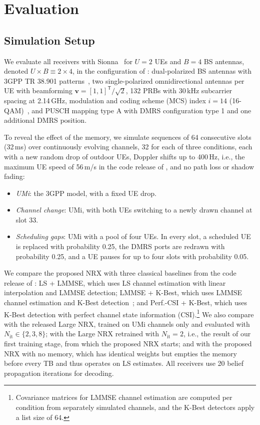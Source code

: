 \section{Evaluation}

\subsection{Simulation Setup}
We evaluate all receivers with Sionna~\cite{hoydis2022} for $U=2$ UEs and $B=4$ BS antennas, denoted $U\times B\equiv 2\times 4$, in the configuration of \citet{wiesmayr2025realtime}: dual-polarized BS antennas with 3GPP TR 38.901 patterns~\cite{tr38901}, two single-polarized omnidirectional antennas per UE with beamforming $\mathbf{v}=[1,1]^{\mathsf{T}}/\sqrt{2}$, 132 PRBs with 30\,kHz subcarrier spacing at 2.14\,GHz, modulation and coding scheme (MCS) index $i=14$ (16-QAM)~\cite[Table~5.1.3.1-1]{3gpp38214}, and PUSCH mapping type A with DMRS configuration type 1 and one additional DMRS position.

To reveal the effect of the memory, we simulate sequences of 64 consecutive slots (32\,ms) over continuously evolving channels, 32 for each of three conditions, each with a new random drop of outdoor UEs, Doppler shifts up to 400\,Hz, i.e., the maximum UE speed of 56\,m/s in the code release of \citet{wiesmayr2025realtime}, and no path loss or shadow fading:
\begin{itemize}
\item \emph{UMi}: the 3GPP model, with a fixed UE drop.
\item \emph{Channel change}: UMi, with both UEs switching to a newly drawn channel at slot 33.
\item \emph{Scheduling gaps}: UMi with a pool of four UEs. In every slot, a scheduled UE is replaced with probability 0.25, the DMRS ports are redrawn with probability 0.25, and a UE pauses for up to four slots with probability 0.05.
\end{itemize}

We compare the proposed NRX with three classical baselines from the code release of \citet{wiesmayr2025realtime}: LS + LMMSE, which uses LS channel estimation with linear interpolation and LMMSE detection; LMMSE + K-Best, which uses LMMSE channel estimation and K-Best detection~\cite{guo2006}; and Perf.-CSI + K-Best, which uses K-Best detection with perfect channel state information (CSI).\footnote{Covariance matrices for LMMSE channel estimation are computed per condition from separately simulated channels, and the K-Best detectors apply a list size of 64.} We also compare with the released Large NRX, trained on UMi channels only and evaluated with $N_{\mathrm{it}}\in\{2,3,8\}$; with the Large NRX retrained with $N_{\mathrm{it}}=2$, i.e., the result of our first training stage, from which the proposed NRX starts; and with the proposed NRX with no memory, which has identical weights but empties the memory before every TB and thus operates on LS estimates. All receivers use 20 belief propagation iterations for decoding.

